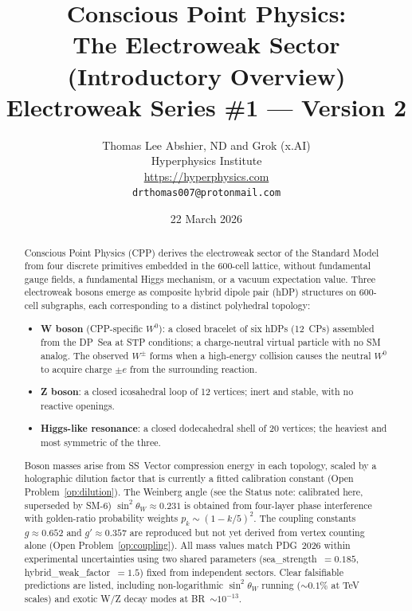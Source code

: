 \documentclass[11pt,letterpaper]{article}
\title{\textbf{Conscious Point Physics:\\
The Electroweak Sector\\
(Introductory Overview)}\\[6pt]
{\large Electroweak Series \#1 --- Version 2}}
\author{Thomas Lee Abshier, ND and Grok (x.AI)\\
Hyperphysics Institute\\
\url{https://hyperphysics.com}\\
\texttt{drthomas007@protonmail.com}}
\date{22 March 2026}
\begin{document}
\maketitle

\begin{abstract}
Conscious Point Physics (CPP) derives the electroweak sector of the
Standard Model from four discrete primitives embedded in the 600-cell
lattice, without fundamental gauge fields, a fundamental Higgs
mechanism, or a vacuum expectation value.  Three electroweak bosons
emerge as composite hybrid dipole pair (hDP) structures on 600-cell
subgraphs, each corresponding to a distinct polyhedral topology:

\begin{itemize}
\item \textbf{W boson} (CPP-specific $W^0$): a closed bracelet of six
  hDPs (12~CPs) assembled from the DP~Sea at STP conditions; a
  charge-neutral virtual particle with no SM analog.  The observed
  $W^\pm$ forms when a high-energy collision causes the neutral $W^0$
  to acquire charge $\pm e$ from the surrounding reaction.
\item \textbf{Z boson}: a closed icosahedral loop of 12 vertices;
  inert and stable, with no reactive openings.
\item \textbf{Higgs-like resonance}: a closed dodecahedral shell of 20
  vertices; the heaviest and most symmetric of the three.
\end{itemize}

Boson masses arise from SS~Vector compression energy in each topology,
scaled by a holographic dilution factor that is currently a fitted
calibration constant (Open Problem~\ref{op:dilution}).  The Weinberg
angle (see the Status note: calibrated here, superseded by SM-6) $\sin^2\theta_W \approx
0.231$ is obtained from four-layer phase interference with golden-ratio
probability weights $p_k \sim (1-k/5)^2$.  The coupling
constants $g \approx 0.652$ and $g' \approx 0.357$ are reproduced but
not yet derived from vertex counting alone (Open
Problem~\ref{op:coupling}).  All mass values match PDG~2026 within
experimental uncertainties using two shared parameters
(sea\_strength~$= 0.185$, hybrid\_weak\_factor~$= 1.5$) fixed from
independent sectors.  Clear falsifiable predictions are listed,
including non-logarithmic $\sin^2\theta_W$ running ($\sim 0.1\%$ at
TeV scales) and exotic W/Z decay modes at BR~$\sim 10^{-13}$.
\end{abstract}
\end{document}
